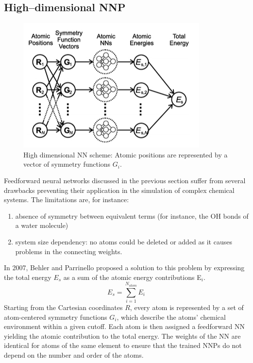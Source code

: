 \documentclass[12pt]{article}
\begin{document}
\subsection{High--dimensional NNP}
\begin{figure}[!htp]
    \centering
    \includegraphics[scale=0.7]{latex_files/High-dimensional-NNP_scheme.jpeg}
    \caption{High dimensional NN scheme: Atomic positions are represented by a vector of symmetry functions $G_i$. }
    \label{High-dimensional-NNP_scheme}
\end{figure}
Feedforward neural networks discussed in the previous section suffer from several drawbacks preventing their application in the simulation of complex chemical systems. The limitations are, for instance:
\begin{enumerate}
    \item absence of symmetry between equivalent terms (for instance, the OH bonds of a water molecule)
    \item system size dependency: no atoms could be deleted or added as it causes problems in the connecting weights.
\end{enumerate}
In 2007, Behler and Parrinello proposed a solution to this problem by expressing the total energy $E_s$ as a sum of the atomic energy contributions E$_i$.\cite{Behler2007}
\begin{equation}
    E_s = \sum_{i=1}^{N_{atom}} E_i
\end{equation}
Starting from the Cartesian coordinates $R$, every atom is represented by a set of atom-centered symmetry functions $G_i$, which describe the atoms' chemical environment within a given cutoff. Each atom is then assigned a feedforward NN yielding the atomic contribution to the total energy. The weights of the NN are identical for atoms of the same element to ensure that the trained NNPs do not depend on the number and order of the atoms.
\end{document}
